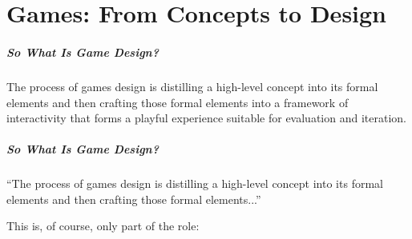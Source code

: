 

\part{Games: From Concepts to Design}
\frame{\partpage}

\begin{frame}
	\frametitle{So What Is Game Design?}
		
	The process of games design is distilling a high-level concept into its formal elements and then crafting those formal elements into a framework of interactivity that forms a playful experience suitable for evaluation and iteration.
	
\end{frame}

\begin{frame}
	\frametitle{So What Is Game Design?}
		
	``The process of games design is distilling a high-level concept into its formal elements and then crafting those formal elements...''
	
	This is, of course, only part of the role:

\end{frame}
